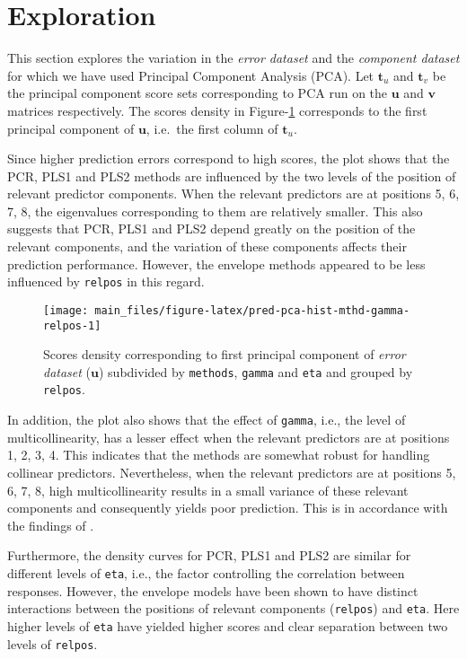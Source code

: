 \documentclass[review]{elsarticle}
\begin{document}
\hypertarget{exploration}{%
\section{Exploration}\label{exploration}}

This section explores the variation in the \emph{error dataset} and the \emph{component dataset} for which we have used Principal Component Analysis (PCA). Let \(\mathbf{t}_u\) and \(\mathbf{t}_v\) be the principal component score sets corresponding to PCA run on the \(\mathbf{u}\) and \(\mathbf{v}\) matrices respectively. The scores density in Figure-\ref{fig:pred-pca-hist-mthd-gamma-relpos} corresponds to the first principal component of \(\mathbf{u}\), i.e.~the first column of \(\mathbf{t}_u\).

Since higher prediction errors correspond to high scores, the plot shows that the PCR, PLS1 and PLS2 methods are influenced by the two levels of the position of relevant predictor components. When the relevant predictors are at positions 5, 6, 7, 8, the eigenvalues corresponding to them are relatively smaller. This also suggests that PCR, PLS1 and PLS2 depend greatly on the position of the relevant components, and the variation of these components affects their prediction performance. However, the envelope methods appeared to be less influenced by \texttt{relpos} in this regard.



\begin{figure}[!htb]
\texttt{[image: main\_files/figure-latex/pred-pca-hist-mthd-gamma-relpos-1]} \caption{Scores density corresponding to first principal component of \emph{error dataset} (\(\mathbf{u}\)) subdivided by \texttt{methods}, \texttt{gamma} and \texttt{eta} and grouped by \texttt{relpos}.}\label{fig:pred-pca-hist-mthd-gamma-relpos}
\end{figure}

In addition, the plot also shows that the effect of \texttt{gamma}, i.e., the level of multicollinearity, has a lesser effect when the relevant predictors are at positions 1, 2, 3, 4. This indicates that the methods are somewhat robust for handling collinear predictors. Nevertheless, when the relevant predictors are at positions 5, 6, 7, 8, high multicollinearity results in a small variance of these relevant components and consequently yields poor prediction. This is in accordance with the findings of \citet{Helland1994b}.

Furthermore, the density curves for PCR, PLS1 and PLS2 are similar for different levels of \texttt{eta}, i.e., the factor controlling the correlation between responses. However, the envelope models have been shown to have distinct interactions between the positions of relevant components (\texttt{relpos}) and \texttt{eta}. Here higher levels of \texttt{eta} have yielded higher scores and clear separation between two levels of \texttt{relpos}.
\end{document}
